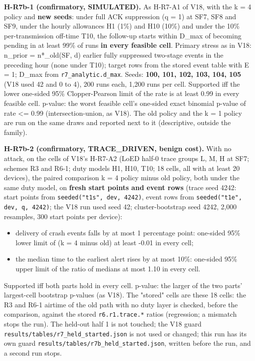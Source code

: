 \textbf{H-R7b-1 (confirmatory, SIMULATED).} As H-R7-A1 of V18, with the k = 4 policy and \textbf{new seeds}: under full ACK suppression (q = 1) at SF7, SF8 and SF9, under the hourly allowances H1 (1\%) and H10 (10\%) and under the 10\% per-transmission off-time T10, the follow-up starts within D\_max of becoming pending in at least 99\% of runs \textbf{in every feasible cell}. Primary stress as in V18: n\_prior = n*\_old(SF, d) earlier fully suppressed two-stage events in the preceding hour (none under T10); target rows from the stored event table with E = 1; D\_max from \texttt{r7\_analytic.d\_max}. Seeds: \textbf{100, 101, 102, 103, 104, 105} (V18 used 42 and 0 to 4), 200 runs each, 1,200 runs per cell. Supported iff the lower one-sided 95\% Clopper-Pearson limit of the rate is at least 0.99 in every feasible cell. p-value: the worst feasible cell's one-sided exact binomial p-value of rate <= 0.99 (intersection-union, as V18). The old policy and the k = 1 policy are run on the same draws and reported next to it (descriptive, outside the family).

\textbf{H-R7b-2 (confirmatory, TRACE\_DRIVEN, benign cost).} With no attack, on the cells of V18's H-R7-A2 (LoED half-0 trace groups L, M, H at SF7; schemes R3 and R6-1; duty models H1, H10, T10; 18 cells, all with at least 20 devices), the paired comparison k = 4 policy minus old policy, both under the same duty model, on \textbf{fresh start points and event rows} (trace seed 4242: start points from \texttt{seeded("t1s", dev, 4242)}, event rows from \texttt{seeded("t1e", dev, q, 4242)}; the V18 run used seed 42; cluster-bootstrap seed 4242, 2,000 resamples, 300 start points per device):
\begin{itemize}
\item delivery of crash events falls by at most 1 percentage point: one-sided 95\% lower limit of (k = 4 minus old) at least -0.01 in every cell;
\item the median time to the earliest alert rises by at most 10\%: one-sided 95\% upper limit of the ratio of medians at most 1.10 in every cell.
\end{itemize}

Supported iff both parts hold in every cell. p-value: the larger of the two parts' largest-cell bootstrap p-values (as V18). The "stored" cells are these 18 cells: the R3 and R6-1 airtime of the old path with no duty layer is checked, before the comparison, against the stored \texttt{r6.r1.trace.*} ratios (regression; a mismatch stops the run). The held-out half 1 is not touched; the V18 guard \texttt{results/tables/r7\_held\_started.json} is not used or changed; this run has its own guard \texttt{results/tables/r7b\_held\_started.json}, written before the run, and a second run stops.


